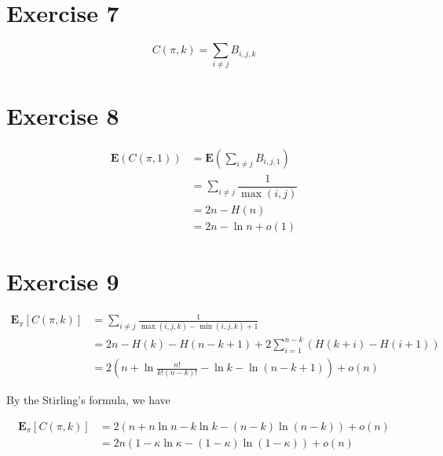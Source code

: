 \documentclass[
]{article}
\begin{document}
\hypertarget{exercise-7}{%
\section{Exercise 7}\label{exercise-7}}

\[C(\pi,k)=\sum_{i\neq j} B_{i,j,k}\]

\hypertarget{exercise-8}{%
\section{Exercise 8}\label{exercise-8}}

\[\begin{aligned}
\mathbf E(C(\pi,1))&=\mathbf E\left(\sum_{i\neq j} B_{i,j,1}\right)\\
&=\sum_{i\neq j}\dfrac{1}{\max(i,j)}\\
&=2n-H(n)\\
&=2n-\ln n+o(1)
\end{aligned}\]

\hypertarget{exercise-9}{%
\section{Exercise 9}\label{exercise-9}}

\[\begin{aligned}
\mathbf{E}_{\pi}[C(\pi,k)]
&=\sum_{i\neq j}\frac{1}{\max(i,j,k)-\min(i,j,k)+1}\\
&=2n-H(k)-H(n-k+1)+2\sum_{i=1}^{n-k}\left(H(k+i)-H(i+1)\right)\\
&=2\left(n+\ln\frac{n!}{k!(n-k)!}-\ln k-\ln(n-k+1)\right)+o(n)
\end{aligned}\]

By the Stirling's formula, we have

\[\begin{aligned}
\mathbf{E}_{\pi}[C(\pi,k)]
&=2\left(n+n\ln n-k\ln k-(n-k)\ln(n-k)\right)+o(n)\\
&=2n(1-\kappa\ln\kappa-(1-\kappa)\ln(1-\kappa))+o(n)
\end{aligned}\]
\end{document}
